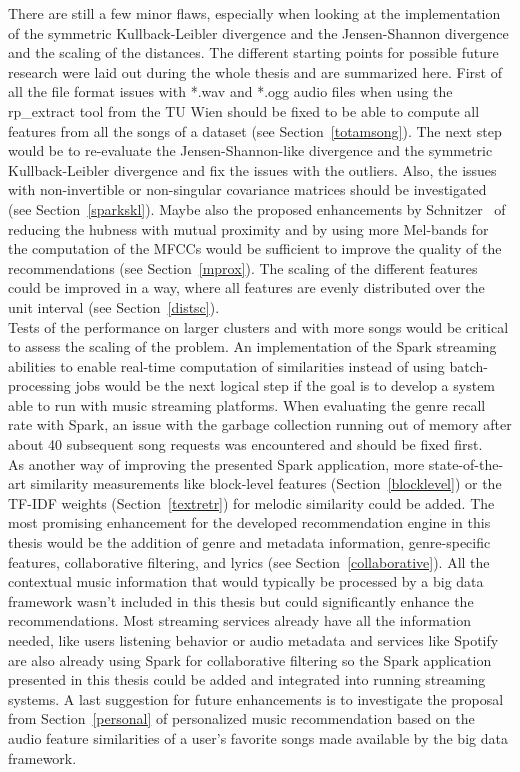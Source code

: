 There are still a few minor flaws, especially when looking at the implementation of the symmetric Kullback-Leibler divergence and the Jensen-Shannon divergence and the scaling of the distances. The different starting points for possible future research were laid out during the whole thesis and are summarized here. First of all the file format issues with *.wav and *.ogg audio files when using the rp\_extract tool from the TU Wien should be fixed to be able to compute all features from all the songs of a dataset (see Section~\ref{totamsong}).
The next step would be to re-evaluate the Jensen-Shannon-like divergence and the symmetric Kullback-Leibler divergence and fix the issues with the outliers. Also, the issues with non-invertible or non-singular covariance matrices should be investigated (see Section~\ref{sparkskl}). Maybe also the proposed enhancements by Schnitzer~\cite{schnitzer1} of reducing the hubness with mutual proximity and by using more Mel-bands for the computation of the MFCCs would be sufficient to improve the quality of the recommendations (see Section~\ref{mprox}). The scaling of the different features could be improved in a way, where all features are evenly distributed over the unit interval (see Section~\ref{distsc}).\\
Tests of the performance on larger clusters and with more songs would be critical to assess the scaling of the problem.
An implementation of the Spark streaming abilities to enable real-time computation of similarities instead of using batch-processing jobs would be the next logical step if the goal is to develop a system able to run with music streaming platforms. When evaluating the genre recall rate with Spark, an issue with the garbage collection running out of memory after about 40 subsequent song requests was encountered and should be fixed first.\\
\noindent As another way of improving the presented Spark application, more state-of-the-art similarity measurements like block-level features (Section~\ref{blocklevel}) or the TF-IDF weights (Section~\ref{textretr}) for melodic similarity could be added. The most promising enhancement for the developed recommendation engine in this thesis would be the addition of genre and metadata information, genre-specific features, collaborative filtering, and lyrics (see Section~\ref{collaborative}). All the contextual music information that would typically be processed by a big data framework wasn't included in this thesis but could significantly enhance the recommendations. Most streaming services already have all the information needed, like users listening behavior or audio metadata and services like Spotify are also already using Spark for collaborative filtering so the Spark application presented in this thesis could be added and integrated into running streaming systems. A last suggestion for future enhancements is to investigate the proposal from Section~\ref{personal} of personalized music recommendation based on the audio feature similarities of a user's favorite songs made available by the big data framework.


